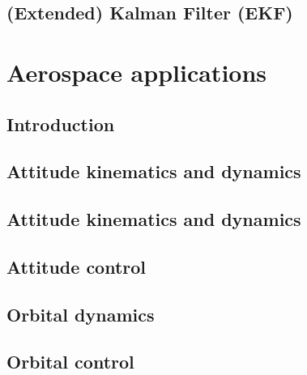 \documentclass[a4paper, 12pt]{report}
\begin{document}
\chapter{(Extended) Kalman Filter (EKF)}


\part{Aerospace applications}
\chapter{Introduction}

\chapter{Attitude kinematics and dynamics}



\chapter{Attitude kinematics and dynamics}
\chapter{Attitude control}
\chapter{Orbital dynamics}
\chapter{Orbital control}
\end{document}
